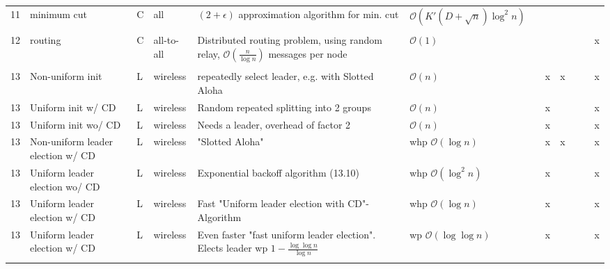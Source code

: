 \documentclass{article}
\begin{document}
\begin{table}
\begin{tabular}{@{}p{3mm}|p{30mm}|p{2mm}|p{13mm}|p{117mm}|p{30mm}|p{25mm}|p{2mm}|p{2mm}|p{2mm}|p{2mm}|p{3mm}}
	&  &  &  &  &  &  &  &  &  &  &  \\ 
	\hline 
	
	11 & minimum cut & C & all & $(2+\epsilon)$ approximation algorithm for min. cut & \footnotesize{$\mathcal{O}(K'(D + \sqrt{n})\log^2 n)$} &  &  &  &  &  &  \\ 
	\hline
	
	&  &  &  &  &  &  &  &  &  &  &  \\ 
	\hline 
	
	12 & routing & C & all-to-all & Distributed routing problem, using random relay, $\mathcal{O}(\frac{n}{\log n})$ messages per node & $\mathcal{O}(1)$ &  &  &  &  &  & x \\ 
	\hline 
	
	&  &  &  &  &  &  &  &  &  &  &  \\ 
	\hline 
	
	13 & Non-uniform init & L & wireless & repeatedly select leader, e.g. with Slotted Aloha  & $\mathcal{O}(n)$ &  & x & x &  &  & x \\ 
	\hline 
	
	13 & Uniform init w/ CD & L & wireless & Random repeated splitting into 2 groups & $\mathcal{O}(n)$ &  & x &  &  &  & x \\ 
	\hline 
	
	13 & Uniform init wo/ CD & L & wireless & Needs a leader, overhead of factor 2 & $\mathcal{O}(n)$ &  & x &  &  &  & x \\ 
	\hline 
	
	13 & Non-uniform leader election w/ CD & L & wireless & "Slotted Aloha" & whp $\mathcal{O}(\log n)$ &  & x & x &  &  & x \\ 
	\hline 
	
	13 & Uniform leader election wo/ CD & L & wireless & Exponential backoff algorithm (13.10) & whp $\mathcal{O}(\log^2 n)$ &  & x &  &  &  & x \\ 
	\hline 
	
	13 & Uniform leader election w/ CD & L & wireless & Fast "Uniform leader election with CD"-Algorithm & whp $\mathcal{O}(\log n)$ &  & x &  &  &  & x \\ 
	\hline 
	
	13 & Uniform leader election w/ CD & L & wireless & Even faster "fast uniform leader election". Elects leader wp $1 - \frac{\log \log n}{\log n}$ & wp $\mathcal{O}(\log \log n)$ &  & x &  &  &  & x \\ 
	\hline 
	
	&  &  &  &  &  &  &  &  &  &  &  \\ 
	\hline 
	
\end{tabular} 
\end{table}
\end{document}
